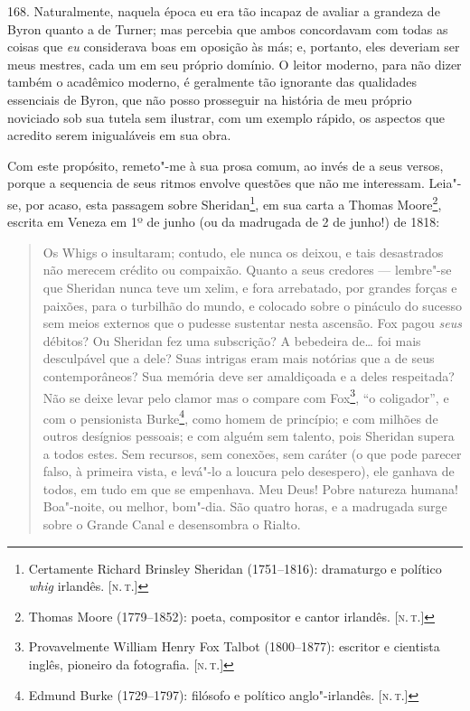 168. Naturalmente, naquela época eu era tão incapaz de avaliar a
grandeza de Byron quanto a de Turner; mas percebia que ambos concordavam
com todas as coisas que \emph{eu} considerava boas em oposição às más;
e, portanto, eles deveriam ser meus mestres, cada um em seu próprio
domínio. O leitor moderno, para não dizer também o acadêmico moderno, é
geralmente tão ignorante das qualidades essenciais de Byron, que não
posso prosseguir na história de meu próprio noviciado sob sua tutela sem
ilustrar, com um exemplo rápido, os aspectos que acredito serem
inigualáveis em sua obra.

Com este propósito, remeto"-me à sua prosa comum, ao invés de a seus
versos, porque a sequencia de seus ritmos envolve questões que não me
interessam. Leia"-se, por acaso, esta passagem sobre Sheridan\footnote{Certamente
  Richard Brinsley Sheridan (1751--1816): dramaturgo e político
  \emph{whig} irlandês. {[}\textsc{n.\,t.}{]}}, em sua carta a Thomas
Moore\footnote{Thomas Moore (1779--1852): poeta, compositor e cantor
  irlandês. {[}\textsc{n.\,t.}{]}}, escrita em Veneza em 1º de junho (ou da
madrugada de 2 de junho!) de 1818: %

\begin{quote}
Os Whigs o insultaram; contudo, ele nunca os deixou, e tais
desastrados não merecem crédito ou compaixão. Quanto a seus credores ---
lembre"-se que Sheridan nunca teve um xelim, e fora arrebatado, por
grandes forças e paixões, para o turbilhão do mundo, e colocado sobre o
pináculo do sucesso sem meios externos que o pudesse sustentar nesta
ascensão. Fox pagou \emph{seus} débitos? Ou Sheridan fez uma subscrição?
A bebedeira de\ldots{} foi mais desculpável que a dele? Suas intrigas eram
mais notórias que a de seus contemporâneos? Sua memória deve ser
amaldiçoada e a deles respeitada? Não se deixe levar pelo clamor mas o
compare com Fox\footnote{Provavelmente William Henry Fox Talbot
  (1800--1877): escritor e cientista inglês, pioneiro da fotografia. {[}\textsc{n.\,t.}{]}}, ``o coligador'', e com o pensionista Burke\footnote{Edmund
  Burke (1729--1797): filósofo e político anglo"-irlandês. {[}\textsc{n.\,t.}{]}},
como homem de princípio; e com milhões de outros desígnios pessoais; e
com alguém sem talento, pois Sheridan supera a todos estes. Sem
recursos, sem conexões, sem caráter (o que pode parecer falso, à
primeira vista, e levá"-lo a loucura pelo desespero), ele ganhava de
todos, em tudo em que se empenhava. Meu Deus! Pobre natureza humana!
Boa"-noite, ou melhor, bom"-dia. São quatro horas, e a madrugada surge
sobre o Grande Canal e desensombra o Rialto.
\end{quote}

